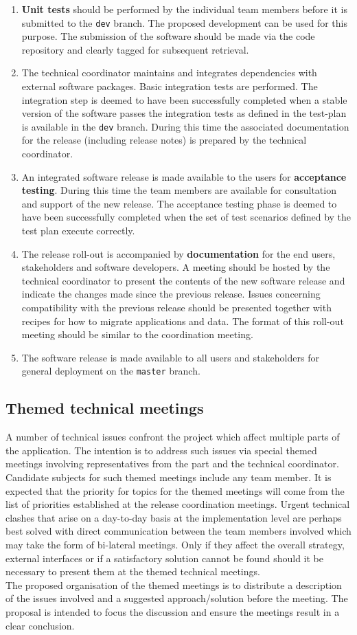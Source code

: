 \begin{enumerate}
\item \textbf{Unit tests} should be performed by the individual team members before it is submitted to the \texttt{dev} branch. The proposed development can be used for this purpose. The submission of the software should be made via the code repository and clearly tagged for subsequent retrieval.
\item The technical coordinator maintains and integrates dependencies with external software packages. Basic integration tests are performed. The integration step is deemed to have been successfully completed when a stable version of the software passes the integration tests as defined in the test-plan is available in the \texttt{dev} branch. During this time the associated documentation for the release (including release notes) is prepared by the technical coordinator.
\item An integrated software release is made available to the users for \textbf{acceptance testing}. During this time the team members are available for consultation and support of the new release. The acceptance testing phase is deemed to have been successfully completed when the set of test scenarios defined by the test plan execute correctly.
\item The release roll-out is accompanied by \textbf{documentation} for the end users, stakeholders and software developers. A meeting should be hosted by the technical coordinator to present the contents of the new software release and indicate the changes made since the previous release. Issues concerning compatibility with the previous release should be presented together with recipes for how to migrate applications and data. The format of this roll-out meeting should be similar to the coordination meeting.
\item The software release is made available to all users and stakeholders for general deployment on the \texttt{master} branch.
\end{enumerate}

\subsection{Themed technical meetings}

\noindent A number of technical issues confront the project which affect multiple parts of the application. The intention is to address such issues via special themed meetings involving representatives from the part and the technical coordinator. Candidate subjects for such themed meetings include any team member. It is expected that the priority for topics for the themed meetings will come from the list of priorities established at the release coordination meetings. Urgent technical clashes that arise on a day-to-day basis at the implementation level are perhaps best solved with direct communication between the team members involved which may take the form of bi-lateral meetings. Only if they affect the overall strategy, external interfaces or if a satisfactory solution cannot be found should it be necessary to present them at the themed technical meetings.\\

\noindent The proposed organisation of the themed meetings is to distribute a description of the issues involved and a suggested approach/solution before the meeting. The proposal is intended to focus the discussion and ensure the meetings result in a clear conclusion.

